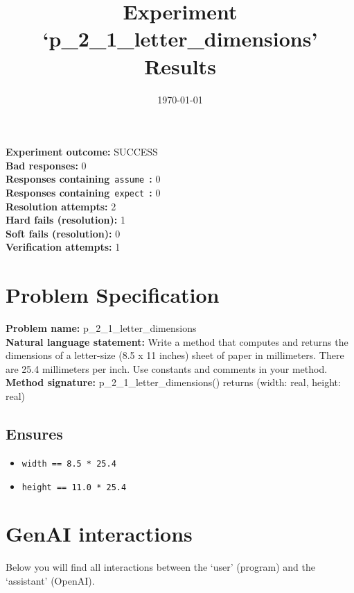 \documentclass{article}
\begin{document}
\title{Experiment `p\_2\_1\_letter\_dimensions' Results}
\author{\today}
\date{}
\maketitle
\textbf{Experiment outcome: }SUCCESS
\\\textbf{Bad responses: }0
\\\textbf{Responses containing}~\texttt{assume}~\textbf{: }0
\\\textbf{Responses containing}~\texttt{expect}~\textbf{: }0
\\\textbf{Resolution attempts: }2
\\\textbf{Hard fails (resolution): }1
\\\textbf{Soft fails (resolution): }0
\\\textbf{Verification attempts: }1
\section*{Problem Specification}
\textbf{Problem name: }p\_2\_1\_letter\_dimensions
\\\textbf{Natural language statement: }Write a method that computes and returns the dimensions of a letter-size (8.5 x 11 inches) sheet of paper in millimeters. There are 25.4 millimeters per inch. Use constants and comments in your method.
\\\textbf{Method signature: }p\_2\_1\_letter\_dimensions() returns (width: real, height: real)
\subsection*{Ensures}
\begin{itemize}
\item \texttt{width == 8.5 * 25.4}
\item \texttt{height == 11.0 * 25.4}
\end{itemize}
\clearpage
\section*{GenAI interactions}
Below you will find all interactions between the `user' (program) and the `assistant' (OpenAI).
\end{document}
